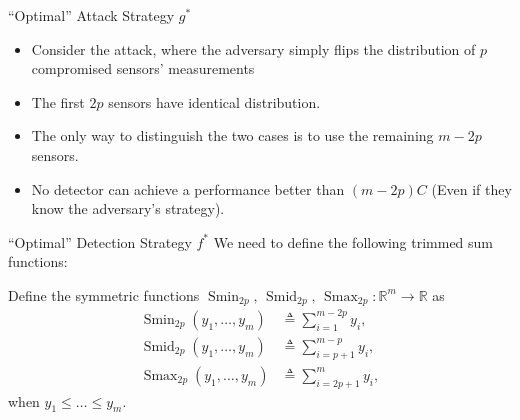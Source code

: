 \documentclass[10pt]{beamer}
\newcommand{\tikzdir}[1]{#1.tikz}
\newcommand{\inputtikz}[1]{}}
\DeclareMathOperator{\Smin}{Smin}
\DeclareMathOperator{\Smid}{Smid}
\DeclareMathOperator{\Smax}{Smax}
\begin{document}
\begin{frame}{``Optimal'' Attack Strategy $g^*$}
  \begin{itemize}
  \item Consider the attack, where the adversary simply flips the distribution of $p$ compromised sensors' measurements
    \begin{center}
      \inputtikz{attack}
    \end{center}
  \item The first $2p$ sensors have identical distribution.
  \item The only way to distinguish the two cases is to use the remaining $m-2p$ sensors.
  \item No detector can achieve a performance better than $(m-2p)C$ (Even if they know the adversary's strategy).
  \end{itemize}
\end{frame}

\begin{frame}{``Optimal'' Detection Strategy $f^*$}
  We need to define the following trimmed sum functions:
  \begin{definition}
    Define the symmetric functions $\Smin_{2p},\,\Smid_{2p},\,\Smax_{2p}:\mathbb R^{m}\rightarrow \mathbb R$ as  
    \begin{align*}
      \Smin_{2p}(y_1,\ldots,y_m) &\triangleq \sum_{i=1}^{m-2p}y_i,\\
      \Smid_{2p}(y_1,\ldots,y_m) &\triangleq \sum_{i=p+1}^{m-p}y_i,\\
      \Smax_{2p}(y_1,\ldots,y_m) &\triangleq \sum_{i=2p+1}^{m}y_i,
    \end{align*}
    when $y_1\leq \dots\leq y_m$.
  \end{definition}
\end{frame}
\end{document}

